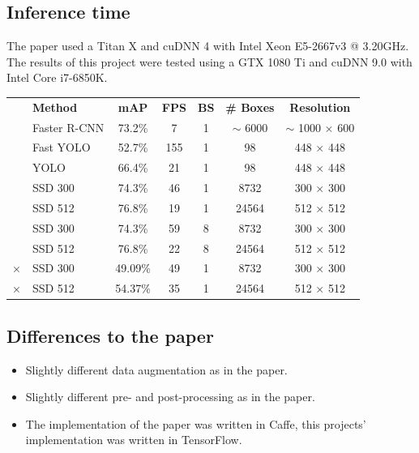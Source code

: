 \documentclass[a0, portrait]{a0poster}
\begin{document}
\begin{multicols}{3}
\subsection*{Inference time}

The paper used a Titan X and cuDNN 4 with Intel Xeon E5-2667v3 @ 3.20GHz. The results of this project were tested using a GTX 1080 Ti and cuDNN 9.0 with Intel Core i7-6850K.
\begin{center}\vspace{1cm}
  \begin{tabular}{rl|c|c|c|c|c}
    & \textbf{Method} & \textbf{mAP} & \textbf{FPS} & \textbf{BS} & \textbf{\# Boxes} & \textbf{Resolution} \\ \cline{2-7}
    & Faster R-CNN & 73.2\% & 7 & 1 & $\sim$ 6000 & $\sim$ 1000 $\times$ 600 \\ \cline{2-7}
    & Fast YOLO & 52.7\% & 155 & 1 & 98 & 448 $\times$ 448 \\
    & YOLO & 66.4\% & 21 & 1 & 98 & 448 $\times$ 448 \\ \cline{2-7}
    & SSD 300 & 74.3\% & 46 & 1 & 8732 & 300 $\times$ 300 \\
    & SSD 512 & 76.8\% & 19 & 1 & 24564 & 512 $\times$ 512 \\
    & SSD 300 & 74.3\% & 59 & 8 & 8732 & 300 $\times$ 300 \\
    & SSD 512 & 76.8\% & 22 & 8 & 24564 & 512 $\times$ 512 \\ \cmidrule(r){2-7} \morecmidrules \cmidrule(r){2-7}
    $\times$ & SSD 300 & 49.09\% & 49 & 1 & 8732 & 300 $\times$ 300 \\
    $\times$ & SSD 512 & 54.37\% & 35 & 1 & 24564 & 512 $\times$ 512
  \end{tabular}
\end{center}

\subsection*{Differences to the paper}

\begin{itemize}
  \item Slightly different data augmentation as in the paper.
  \item Slightly different pre- and post-processing as in the paper.
  \item The implementation of the paper was written in Caffe, this projects' implementation was written in TensorFlow.
\end{itemize}


\end{multicols}
\end{document}
